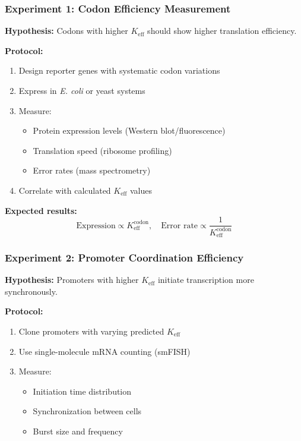 \documentclass[12pt]{article}
\begin{document}
	\subsubsection{Experiment 1: Codon Efficiency Measurement}
	\textbf{Hypothesis:} Codons with higher $K_{\text{eff}}$ should show higher translation efficiency.
	
	\textbf{Protocol:}
	\begin{enumerate}
		\item Design reporter genes with systematic codon variations
		\item Express in \textit{E. coli} or yeast systems
		\item Measure:
		\begin{itemize}
			\item Protein expression levels (Western blot/fluorescence)
			\item Translation speed (ribosome profiling)
			\item Error rates (mass spectrometry)
		\end{itemize}
		\item Correlate with calculated $K_{\text{eff}}$ values
	\end{enumerate}
	
	\textbf{Expected results:}
	\[
	\text{Expression} \propto K_{\text{eff}}^{\text{codon}}, \quad \text{Error rate} \propto \frac{1}{K_{\text{eff}}^{\text{codon}}}
	\]
	
	\subsubsection{Experiment 2: Promoter Coordination Efficiency}
	\textbf{Hypothesis:} Promoters with higher $K_{\text{eff}}$ initiate transcription more synchronously.
	
	\textbf{Protocol:}
	\begin{enumerate}
		\item Clone promoters with varying predicted $K_{\text{eff}}$
		\item Use single-molecule mRNA counting (smFISH)
		\item Measure:
		\begin{itemize}
			\item Initiation time distribution
			\item Synchronization between cells
			\item Burst size and frequency
		\end{itemize}
	\end{enumerate}
	
\end{document}
